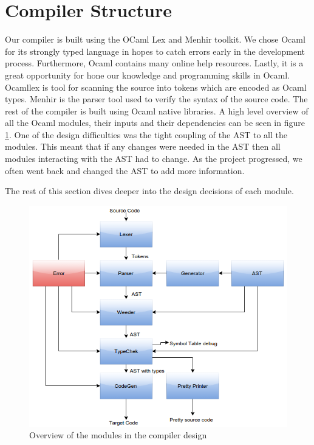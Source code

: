 \documentclass{article}
\begin{document}
\section{Compiler Structure}
Our compiler is built using the OCaml Lex and Menhir toolkit. We chose Ocaml for its strongly typed language in hopes to catch errors early in the development process. Furthermore, Ocaml contains many online help resources. Lastly, it is a great opportunity for hone our knowledge and programming skills in Ocaml. Ocamllex is tool for scanning the source into tokens which are encoded as Ocaml types. Menhir is the parser tool used to verify the syntax of the source code. The rest of the compiler is built using Ocaml native libraries. A high level overview of all the Ocaml modules, their inputs and their dependencies can be seen in figure \ref{fig:copmiler}. One of the design difficulties was the tight coupling of the AST to all the modules. This meant that if any changes were needed in the AST then all modules interacting with the AST had to change. As the project progressed, we often went back and changed the AST to add more information.

The rest of this section dives deeper into the design decisions of each module.

\begin{figure}[!h]
\centering
\includegraphics[width=1.0\textwidth]{compiler}
\caption{Overview of the modules in the compiler design}
\label{fig:copmiler}
\end{figure}
\end{document}
